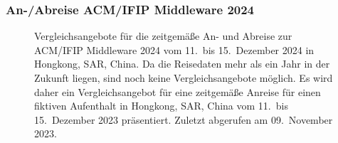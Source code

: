 \clearpage
\subsubsection{An-/Abreise ACM/IFIP Middleware 2024}
\label{sec:anhang:reisen:middleware}

\begin{figure}[!h]
    \centering
    \caption{
        Vergleichsangebote für die zeitgemäße An- und Abreise zur ACM/IFIP Middleware 2024 vom 11.~bis 15.~Dezember 2024 in Hongkong, SAR, China.
        Da die Reisedaten mehr als ein Jahr in der Zukunft liegen, sind noch keine Vergleichsangebote möglich.
        Es wird daher ein Vergleichsangebot für eine zeitgemäße Anreise für einen fiktiven Aufenthalt in Hongkong, SAR, China vom 11.~bis 15.~Dezember 2023 präsentiert.
        Zuletzt abgerufen am 09.~November 2023.
    }
\end{figure}



